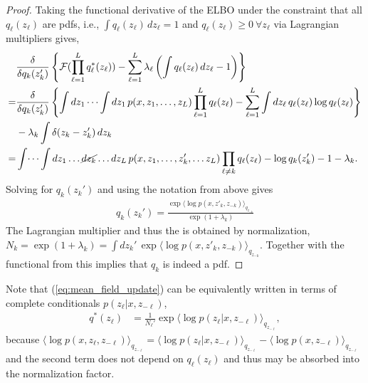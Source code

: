 \begin{proof}
	Taking  the functional derivative of the ELBO under the constraint that all $q_\ell(z_\ell)$ are pdfs, i.e., $\int q_\ell(z_\ell)\,dz_\ell = 1$ and  $q_\ell(z_\ell) \geq 0 ~ \forall z_\ell$ via Lagrangian multipliers gives, 
	\begin{align*}
		&\frac{\delta}{\delta q_k(z_k')} \left\{\mathcal{F}(\prod _{\ell=1}^L q^*_\ell(z_\ell)) - \sum_{\ell=1}^L \lambda_\ell\left(\int q_\ell(z_\ell)\,dz_\ell - 1\right)\right\} \\
		= &\frac{\delta}{\delta q_k(z_k')} \left\{
		\int dz_1\, \dots \int dz_1\, p(x, z_1, \dots, z_L) \prod _{\ell =1}^L q_\ell(z_\ell)
		- \sum_{\ell=1}^L \int dz_\ell\, q_\ell(z_\ell) \log q_\ell(z_\ell)\right\} \\ 
		&- \lambda_k \int \delta (z_k - z_k' )\,dz_k \\
		= & \int\dots\int dz_1\dots \cancel{dz_k} \dots dz_L \, p(x, z_1, \dots, z_k', \dots z_L) \prod _{\ell \neq k} q_\ell(z_\ell)  -\log q_k(z_k') -1 - \lambda_k.
	\end{align*}
Solving for $q_k(z_k')$ and using the notation from above gives
\begin{align}
q_k(z_k') = \frac{\exp\langle \log p(x, z'_k, z_{-k}) \rangle_{q_{z_{-k }}}}{\exp(1+\lambda_k)}
\end{align}
The Lagrangian multiplier and thus the is obtained by normalization, $N_k = \exp(1+\lambda_k) = \int dz_k' \, \exp\langle \log p(x, z'_k, z_{-k}) \rangle_{q_{z_{-k }}}$. Together with the functional from this implies that $q_k$ is indeed a pdf.
\end{proof}
Note that (\ref{eq:mean_field_update}) can be equivalently written in terms of complete conditionals $p(z_\ell | x, z_{-\ell})$,
\begin{align} \label{eq:conditional_cavi_update}
	q^*(z_\ell) &= \frac{1}{N_\ell'} \exp{\langle \log p(z_\ell | x, z_{-\ell}) \rangle_{q_{z_{-\ell}}}}, 
\end{align}
because $\langle \log p(x, z_\ell, z_{-\ell}) \rangle_{q_{z_{-\ell}}} = \langle \log p(z_\ell | x, z_{-\ell}) \rangle_{q_{z_{-\ell}}} - \langle \log p(x, z_{-\ell}) \rangle_{q_{z_{-\ell}}}$ and the second term does not depend on $q_\ell(z_\ell)$ and thus may be absorbed into the normalization factor. 
